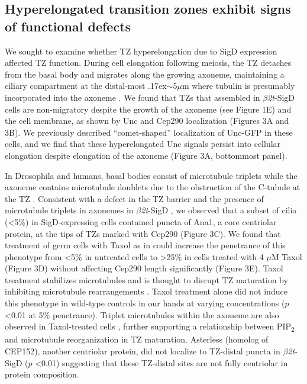 \documentclass[12pt, twoside, letterpaper]{article}
\newcommand{\PIP}{PIP\textsubscript{2}}
\newcommand{\sigd}{$\beta$\textit{2t}-SigD}
\begin{document}
\begin{doublespacing}
\begin{linenumbers}
    \subsection{Hyperelongated transition zones exhibit signs of functional defects}
    We sought to examine whether TZ hyperelongation due to SigD expression
    affected TZ function.
    During cell elongation following meiosis, the TZ detaches from
    the basal body and migrates along the growing axoneme, maintaining a ciliary compartment
    at the distal-most {\raise.17ex\hbox{$\scriptstyle\sim$}}5$\mu$m where tubulin
    is presumably incorporated into the axoneme
    \citep{basiri2014migrating, fabian2012drosophila}.
    We found that
    TZs that assembled in \sigd{} cells are non-migratory despite the growth of the
    axoneme (see Figure 1E) and the cell membrane, as shown by Unc and Cep290 localization
    (Figures 3A and 3B).
    We previously described ``comet-shaped'' localization of Unc-GFP in these cells,
    and we find that these hyperelongated Unc signals persist into cellular elongation
    despite elongation of the axoneme (Figure 3A, bottommost panel).

    In Drosophila and humans, basal bodies consist of microtubule triplets
    \citep{jana2016drosophila, lattao2017centrioles}
    while the axoneme contains microtubule doublets due to the obstruction of
    the C-tubule at the TZ \citep{gottardo2013cilium}.
    Consistent with a defect in the TZ barrier and the presence of
    microtubule triplets in axonemes in \sigd{} \citep{wei2008depletion},
    we observed that a subset of cilia (<5\%) in SigD-expressing cells
    contained puncta of Ana1, a core centriolar protein, at the tips
    of TZs marked with Cep290 (Figure 3C).
    We found that treatment of germ cells with Taxol as in \citep{riparbelli2013unique}
    could increase the penetrance of this phenotype from <5\% in untreated cells
    to \textgreater25\% in cells treated with 4 $\mu$M Taxol (Figure 3D)
    without affecting Cep290 length significantly (Figure 3E).
    Taxol treatment stabilizes microtubules and is thought to disrupt TZ maturation
    by inhibiting microtubule rearrangements \citep{riparbelli2012assembly}.
    Taxol treatment alone did not induce this phenotype in wild-type controls in our hands
    at varying concentrations ($p$ <0.01 at 5\% penetrance).
    Triplet microtubules within the axoneme are also observed in Taxol-treated cells
    \citep{riparbelli2013unique}, further supporting a relationship between
    \PIP{} and microtubule reorganization in TZ maturation.
    Asterless (homolog of CEP152), another centriolar protein,
    did not localize to TZ-distal puncta in \sigd{}
    \citep{dzhindzhev2010asterless, blachon2008drosophila} ($p$ <0.01)
    suggesting that these TZ-distal
    sites are not fully centriolar in protein composition.


\end{linenumbers}
\end{doublespacing}
\end{document}
